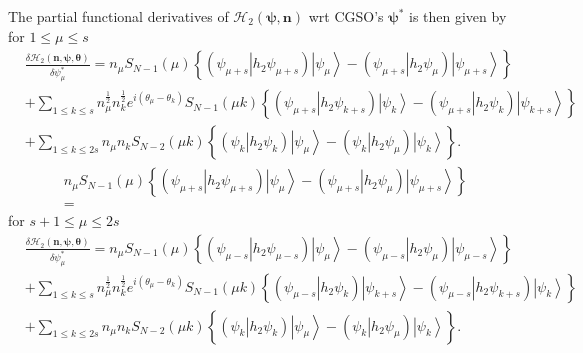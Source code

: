 \documentclass[aps,preprint]{revtex4}%
\begin{document}
The partial functional derivatives of $\mathcal{H}_{2}\left(  \mathbf{\psi
,n}\right)  $ wrt CGSO's $\mathbf{\psi}^{\ast}$ is then given by for $1\leq
\mu\leq s$%
\begin{align}
&  \frac{\delta\mathcal{H}_{2}\left(  \mathbf{n},\mathbf{\psi},\mathbf{\theta
}\right)  }{\delta\psi_{\mu}^{\ast}}=n_{\mu}S_{N-1}\left(  \mu\right)
\left\{  \left(  \left.  \psi_{\mu+s}\right\vert h_{2}\psi_{\mu+s}\right)
\left\vert \psi_{\mu}\right\rangle -\left(  \left.  \psi_{\mu+s}\right\vert
h_{2}\psi_{\mu}\right)  \left\vert \psi_{\mu+s}\right\rangle \right\}
\nonumber\\
&  +\sum_{1\leq k\leq s}n_{\mu}^{\frac{1}{2}}n_{k}^{\frac{1}{2}}e^{i\left(
\theta_{\mu}-\theta_{k}\right)  }S_{N-1}\left(  \mu k\right)  \left\{  \left(
\left.  \psi_{\mu+s}\right\vert h_{2}\psi_{k+s}\right)  \left\vert \psi
_{k}\right\rangle -\left(  \left.  \psi_{\mu+s}\right\vert h_{2}\psi
_{k}\right)  \left\vert \psi_{k+s}\right\rangle \right\} \nonumber\\
&  +\sum_{1\leq k\leq2s}n_{\mu}n_{k}S_{N-2}\left(  \mu k\right)  \left\{
\overset{}{\left(  \left.  \psi_{k}\right\vert h_{2}\psi_{k}\right)
\left\vert \psi_{\mu}\right\rangle }-\left(  \left.  \psi_{k}\right\vert
h_{2}\psi_{\mu}\right)  \left\vert \psi_{k}\right\rangle \right\}  .
\end{align}%
\begin{align}
&  n_{\mu}S_{N-1}\left(  \mu\right)  \left\{  \left(  \left.  \psi_{\mu
+s}\right\vert h_{2}\psi_{\mu+s}\right)  \left\vert \psi_{\mu}\right\rangle
-\left(  \left.  \psi_{\mu+s}\right\vert h_{2}\psi_{\mu}\right)  \left\vert
\psi_{\mu+s}\right\rangle \right\} \\
&  =
\end{align}
for $s+1\leq\mu\leq2s$%
\begin{align}
&  \frac{\delta\mathcal{H}_{2}\left(  \mathbf{n},\mathbf{\psi},\mathbf{\theta
}\right)  }{\delta\psi_{\mu}^{\ast}}=n_{\mu}S_{N-1}\left(  \mu\right)
\left\{  \left(  \left.  \psi_{\mu-s}\right\vert h_{2}\psi_{\mu-s}\right)
\left\vert \psi_{\mu}\right\rangle -\left(  \left.  \psi_{\mu-s}\right\vert
h_{2}\psi_{\mu}\right)  \left\vert \psi_{\mu-s}\right\rangle \right\}
\nonumber\\
&  +\sum_{1\leq k\leq s}n_{\mu}^{\frac{1}{2}}n_{k}^{\frac{1}{2}}e^{i\left(
\theta_{\mu}-\theta_{k}\right)  }S_{N-1}\left(  \mu k\right)  \left\{  \left(
\left.  \psi_{\mu-s}\right\vert h_{2}\psi_{k}\right)  \left\vert \psi
_{k+s}\right\rangle -\left(  \left.  \psi_{\mu-s}\right\vert h_{2}\psi
_{k+s}\right)  \left\vert \psi_{k}\right\rangle \right\} \nonumber\\
&  +\sum_{1\leq k\leq2s}n_{\mu}n_{k}S_{N-2}\left(  \mu k\right)  \left\{
\overset{}{\left(  \left.  \psi_{k}\right\vert h_{2}\psi_{k}\right)
\left\vert \psi_{\mu}\right\rangle }-\left(  \left.  \psi_{k}\right\vert
h_{2}\psi_{\mu}\right)  \left\vert \psi_{k}\right\rangle \right\}  .
\end{align}
\end{document}
